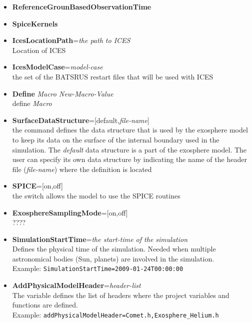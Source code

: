 \begin{itemize} 
 

\item{\bf ReferenceGrounBasedObservationTime} 

\item{\bf SpiceKernels}

\item{\bf IcesLocationPath}={\it the path to ICES} \\ Location of ICES

\item{\bf IcesModelCase}={\it model-case} \\ the set of the BATSRUS restart files that will be used with ICES

\item{\bf Define} {\it Macro New-Macro-Value} \\ define {\it Macro}  

\item{\bf SurfaceDataStructure}=[default,{\it file-name}] \\ the command defines the data structure that is used by the exosphere model to keep its data on the surface of the internal boundary used in the simulation. The {\it default} data structure is a part of the exosphere model. The user can specify its own data structure by indicating the name of the header file ({\it file-name}) where the definition is located

\item {\bf SPICE}=[on,off] \\ the switch allows the model to use the SPICE routines

\item {\bf ExosphereSamplingMode}=[on,off] \\ ????

\item {\bf SimulationStartTime}={\it the start-time of the simulation} \\ Defines the physical time of the simulation. Needed when multiple astronomical bodies (Sun, planets) are involved in the simulation. \\
Example: {\tt SimulationStartTime=2009-01-24T00:00:00}

\item{\bf AddPhysicalModelHeader}={\it header-list} \\ The variable defines the list of headers where the project variables and functions are defined. \\ Example: {\tt addPhysicalModelHeader=Comet.h,Exosphere\_Helium.h}


\end{itemize}
